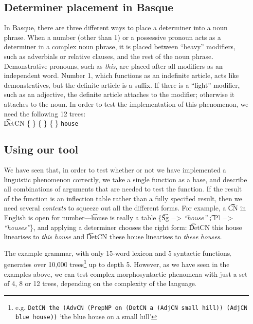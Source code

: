 \subsection{Determiner placement in Basque} In Basque, there are three
different ways to place a determiner into a noun phrase. When a number
(other than 1) or a possessive pronoun acts as a determiner in a
complex noun phrase, it is placed between ``heavy'' modifiers, such as
adverbials or relative clauses, and the rest of the noun
phrase. Demonstrative pronouns, such as \emph{this}, are placed after
all modifiers as an independent word. Number 1, which functions as an
indefinite article, acts like demonstratives, but the definite article
is a suffix. If there is a ``light'' modifier, such as an adjective,
the definite article attaches to the modifier; otherwise it attaches
to the noun. In order to test the implementation of this phenomenon,
we need the following 12 trees:  \\ 
\t{DetCN} \{
\} \{  \} 
\{  \}  {\tt house} 


\subsection{Using our tool} We have seen that, in order to test
whether or not we have implemented a linguistic phenomenon correctly,
we take a single function as a base, and describe all combinations of
arguments that are needed to test the function. If the result of the
function is an inflection table rather than a fully specified result,
then we need several \emph{contexts} to squeeze out all the different
forms. For example, a \t{CN} in English is open for number---\t{house}
is really a table \{\t{Sg =>} \emph{``house''} \t{; Pl =>}
\emph{``houses''}\}, and applying a determiner chooses the right form:
\t{DetCN this house} linearises to \emph{this house} and \t{DetCN
  these house} linearises to \emph{these houses}. 

\label{sec:wishlist_comments}
The example grammar, with only 15-word lexicon and 5 syntactic functions,
generates over 10,000 %
trees\footnote{e.g. {\tt DetCN the (AdvCN (PrepNP on
(DetCN a (AdjCN small hill)) (AdjCN blue house))} `the blue house on a
small hill'}  up to depth 5. 
However, as we have seen in the examples above, we can test complex
morphosyntactic phenomena with just a set of 4, 8 or 12 trees,
depending on the complexity of the language. 

